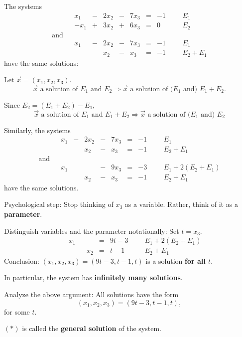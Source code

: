 \documentclass{beamer}
\begin{document}
\begin{frame}
The systems 
\[
\begin{array}{llrrrrrrrrrl}
&&x_1 & - & 2x_2 & - & 7x_3 & = & -1 &&& E_1\\
&&-x_1 & + & 3x_2 & + & 6x_3 & = & 0 &&& E_2\\
\text{and}\\
&&x_1 & - & 2x_2 & - & 7x_3 & = & -1&&&E_1\\
 &&&  & x_2 & - & x_3 & = &-1&&&E_2+E_1 
\end{array}
\]
have the same solutions:

\pause
\bigskip
Let $\vec{x}=(x_1,x_2,x_3)$.
\[
\text{$\vec{x}$ a solution of $E_1$ and $E_2$} \Longrightarrow
\text{$\vec{x}$ a solution of ($E_1$ and) $E_1+E_2$}.
\]

\pause

Since $E_2 = (E_1+E_2)-E_1$,
\[
\text{$\vec{x}$ a solution of $E_1$ and $E_1+E_2$} \Longrightarrow
\text{$\vec{x}$ a solution of ($E_1$ and) $E_2$}
\]
\end{frame}


\begin{frame}
Similarly, the systems 
\[
\begin{array}{llrrrrrrrrrl}
&&x_1 & - & 2x_2 & - & 7x_3 & = & -1&&&E_1\\
 &&&  & x_2 & - & x_3 & = &-1&&&E_2+E_1\\
  \text{and}\\
&&x_1 &  &  & - & 9x_3 & = & -3&&&E_1+2(E_2+E_1)\\
 &&&  & x_2 & - & x_3 & = &-1&&&E_2+E_1 
\end{array}
\]
have the same solutions.

\pause\bigskip
Psychological step: Stop thinking of $x_3$ as a variable. Rather, think of it as a \textbf{parameter}. 

\pause\bigskip
Distinguish variables and the parameter notationally: Set $t=x_3$. 
\[
\begin{array}{llrrrrrrrl}
&&x_1 &  &  &  = & 9t-3&&&E_1+2(E_2+E_1)\\
 &&&  & x_2 &  = &t-1&&&E_2+E_1 
\end{array}
\]
Conclusion: $(x_1,x_2,x_3)=(9t-3,t-1,t)$ is a solution \textbf{for all $t$}.
\end{frame}


\begin{frame}
	\pause
	In particular, the system has \textbf{infinitely many solutions}.

	\pause\bigskip
	Analyze the above argument: All solutions have the form
	\[
	(x_1,x_2,x_3)=(9t-3,t-1,t),\tag{$*$}
	\]
	for some $t$.

	\pause\bigskip
	$(*)$ is called the \textbf{general solution} of the system.
\end{frame}
\end{document}
